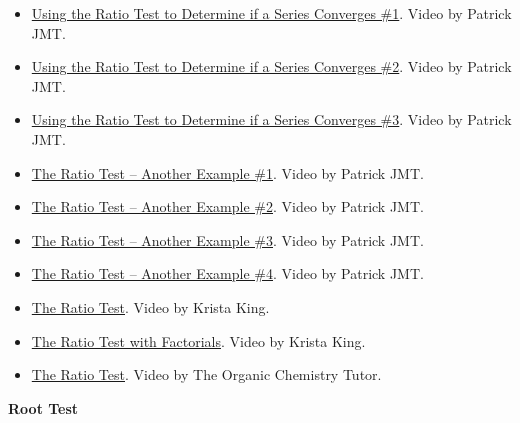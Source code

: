 \begin{itemize}

\item \href{https://www.youtube.com/watch?v=iy8mhbZTY7g}{Using the Ratio Test to Determine if a Series Converges \#1}. 
Video by Patrick JMT.

\item \href{https://www.youtube.com/watch?v=gay5CEXnkhA}{Using the Ratio Test to Determine if a Series Converges \#2}. 
Video by Patrick JMT.

\item \href{https://www.youtube.com/watch?v=AwJ0P8B25tY}{Using the Ratio Test to Determine if a Series Converges \#3}. 
Video by Patrick JMT.

\item \href{https://www.youtube.com/watch?v=nFsoA_dArn4}{The Ratio Test – Another Example \#1}. 
Video by Patrick JMT.

\item \href{https://www.youtube.com/watch?v=KjAkB_2XHaQ}{The Ratio Test – Another Example \#2}. 
Video by Patrick JMT.

\item \href{https://www.youtube.com/watch?v=4H57ndz-FRA}{The Ratio Test – Another Example \#3}. 
Video by Patrick JMT.

\item \href{https://www.youtube.com/watch?v=U5a3Ls4ZhyA}{The Ratio Test – Another Example \#4}. 
Video by Patrick JMT.

\item \href{https://www.youtube.com/watch?v=WeFse6u19fA}{The Ratio Test}. 
Video by Krista King.

\item \href{https://www.youtube.com/watch?v=uMLBA6CHR1E}{The Ratio Test with Factorials}. 
Video by Krista King.

\item \href{https://www.youtube.com/watch?v=kkfILYpkJS8}{The Ratio Test}. 
Video by The Organic Chemistry Tutor.

\end{itemize}

\textbf{Root Test}


